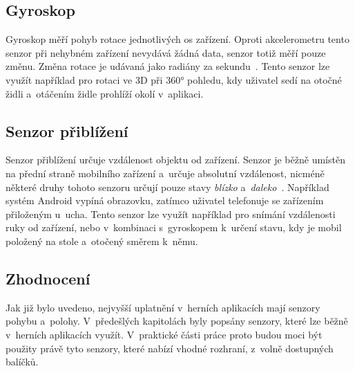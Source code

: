 \subsection{Gyroskop}

Gyroskop měří pohyb rotace jednotlivých os zařízení.
Oproti akcelerometru tento senzor při nehybném zařízení
nevydává žádná data,
senzor totiž měří pouze změnu.
Změna rotace je udávaná jako radiány za sekundu~\cite{sensors_motion}.
Tento senzor lze využít například pro rotaci ve 3D při 360° pohledu,
kdy uživatel sedí na otočné židli a~otáčením židle prohlíží okolí v~aplikaci.

\subsection{Senzor přiblížení}

Senzor přiblížení určuje vzdálenost objektu od zařízení.
Senzor je běžně umístěn na přední straně mobilního zařízení
a~určuje absolutní vzdálenost,
nicméně některé druhy tohoto senzoru určují pouze
stavy \emph{blízko} a~\emph{daleko}~\cite{sensors_position}.
Například systém Android vypíná obrazovku,
zatímco uživatel telefonuje se zařízením přiloženým u~ucha.
Tento senzor lze využít například pro snímání vzdálenosti ruky od zařízení,
nebo v~kombinaci s~gyroskopem k~určení stavu,
kdy je mobil položený na stole a~otočený směrem k~němu.

\subsection{Zhodnocení}

Jak již bylo uvedeno,
nejvyšší uplatnění v~herních aplikacích mají senzory pohybu a~polohy.
V~předešlých kapitolách byly popsány senzory,
které lze běžně v~herních aplikacích využít.
V~praktické části práce proto budou moci být použity právě tyto senzory,
které nabízí vhodné rozhraní,
z~volně dostupných balíčků.
